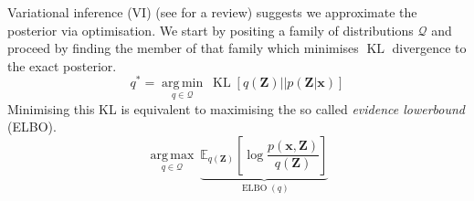 \documentclass[11pt]{article}
\DeclareMathOperator*{\argmin}{arg\,min}
\DeclareMathOperator*{\argmax}{arg\,max}
\DeclareMathOperator{\KL}{KL}
\DeclareMathOperator{\ELBO}{ELBO}
\newcommand{\E}[2]{\ensuremath{\mathbb E_{#1}\left[ #2 \right]}}
\newcommand{\x}{\ensuremath{\mathbf x}}
\newcommand{\Z}{\ensuremath{\mathbf Z}}
\begin{document}
 
Variational inference (VI) \citep{JordanEtAl1999VI} (see \citep{BleiEtAl2017VI} for a review) suggests we approximate the posterior via optimisation. 
 We start by positing a family of distributions $\mathcal Q$ and proceed by finding the member of that family which minimises $\KL$ divergence to the exact posterior. 
 \begin{equation}\label{eq:objective}
 	q^* = \underset{q \in \mathcal Q}{\argmin} ~ \KL\left[q(\Z) || p(\Z|\x) \right]
 \end{equation}
Minimising this KL is equivalent to maximising the so called \emph{evidence lowerbound} (ELBO).
\begin{equation}\label{eq:ELBO}
	\underset{q\in \mathcal Q}{\argmax} ~ \underbrace{\E{q(\Z)}{\log \frac{p(\x, \Z)}{q(\Z)}}}_{\ELBO(q)}
\end{equation}
\end{document}
